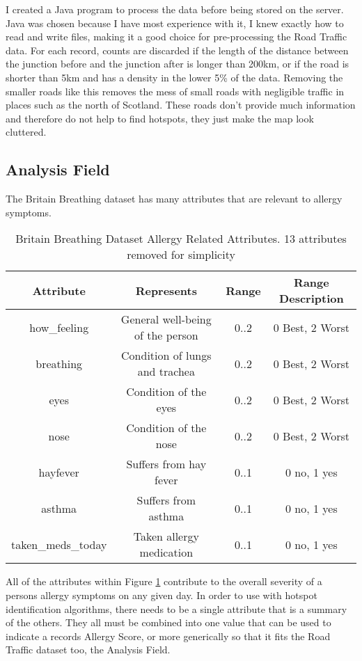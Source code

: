 I created a Java program to process the data before being stored on the server. Java was chosen because I have most experience with it, I knew exactly how to read and write files, making it a good choice for pre-processing the Road Traffic data. For each record, counts are discarded if the length of the distance between the junction before and the junction after is longer than 200km, or if the road is shorter than 5km and has a density in the lower 5\% of the data. Removing the smaller roads like this removes the mess of small roads with negligible traffic in places such as the north of Scotland. These roads don't provide much information and therefore do not help to find hotspots, they just make the map look cluttered.\\

\subsection{Analysis Field}
\label{sec:anal}

The Britain Breathing dataset has many attributes that are relevant to allergy symptoms.\\

\begin{table}[H]
\begin{tabular}{|c|c|c|c|}\hline\hline
Attribute&Represents&Range&Range Description\\\hline
how\_feeling&General well-being of the person&0..2&0 Best, 2 Worst\\
breathing&Condition of lungs and trachea&0..2&0 Best, 2 Worst\\
eyes&Condition of the eyes&0..2&0 Best, 2 Worst\\
nose&Condition of the nose&0..2&0 Best, 2 Worst\\
hayfever&Suffers from hay fever&0..1&0 no, 1 yes\\
asthma&Suffers from asthma&0..1&0 no, 1 yes\\
taken\_meds\_today&Taken allergy medication&0..1&0 no, 1 yes\\\hline\hline
\end{tabular}
\caption{Britain Breathing Dataset Allergy Related Attributes. 13 attributes removed for simplicity}
\label{bbdata}
\end{table}

All of the attributes within Figure \ref{bbdata} contribute to the overall severity of a persons allergy symptoms on any given day. In order to use with hotspot identification algorithms, there needs to be a single attribute that is a summary of the others. They all must be combined into one value that can be used to indicate a records Allergy Score, or more generically so that it fits the Road Traffic dataset too, the Analysis Field.\\

